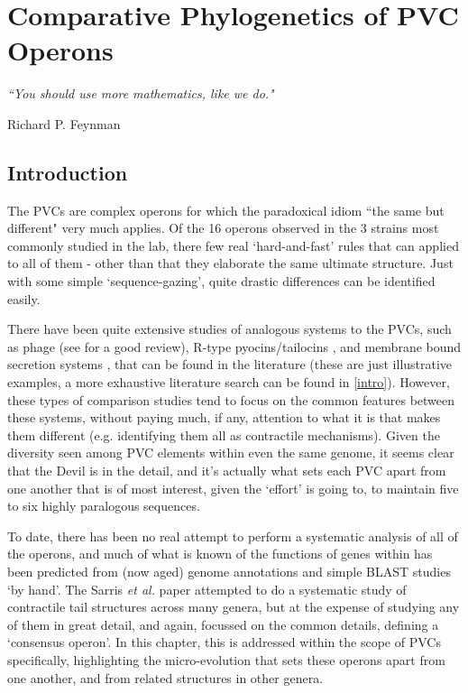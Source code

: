 \chapter{Comparative Phylogenetics of PVC Operons}\label{bioinformatics}

\epigraph{\textit{``You should use more mathematics, like we do."}}{Richard P. Feynman}

\section{Introduction}
The PVCs are complex operons for which the paradoxical idiom ``the same but different" very much applies. Of the 16 operons  observed in the 3 strains most commonly studied in the lab, there few real `hard-and-fast' rules that can applied to all of them - other than that they elaborate the same ultimate structure. Just with some simple `sequence-gazing', quite drastic differences can be identified easily.

There have been quite extensive studies of analogous systems to the PVCs, such as phage (see \citep{Yap2014} for a good review), R-type pyocins/tailocins \citep{Ge2015, Ghequire2015}, and membrane bound secretion systems \citep{Cascales2012}, that can be found in the literature \citep{Sarris2014, Kube2015} (these are just illustrative examples, a more exhaustive literature search can be found in \vref{intro}). However, these types of comparison studies tend to focus on the common features between these systems, without paying much, if any, attention to what it is that makes them different (e.g. identifying them all as contractile mechanisms). Given the diversity seen among PVC elements within even the same genome, it seems clear that the Devil is in the detail, and it's actually what sets each PVC apart from one another that is of most interest, given the `effort' \Pa{} is going to, to maintain five to six highly paralogous sequences.

To date, there has been no real attempt to perform a systematic analysis of all of the operons, and much of what is known of the functions of genes within has been predicted from (now aged) genome annotations and simple BLAST studies `by hand'. The Sarris \emph{et al.} paper attempted to do a systematic study of contractile tail structures across many genera, but at the expense of studying any of them in great detail, and again, focussed on the common details, defining a `consensus operon'. In this chapter, this is addressed within the scope of PVCs specifically, highlighting the micro-evolution that sets these operons apart from one another, and from related structures in other genera.

